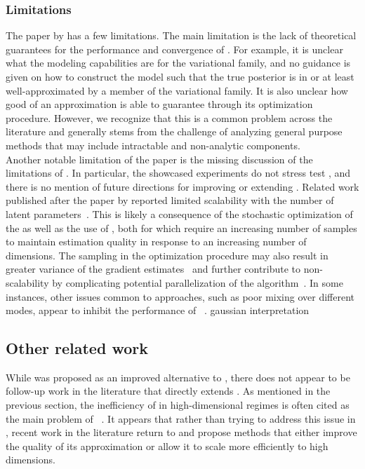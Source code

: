 \documentclass[10pt]{article}
\begin{document}
\subsubsection{Limitations}

The paper by \citet{Titsias:2019} has a few limitations. The main limitation is the lack of theoretical guarantees for the performance and convergence of \uivi. For example, it is unclear what the modeling capabilities are for the \uivi variational family, and no guidance is given on how to construct the model such that the true posterior is in or at least well-approximated by a member of the variational family. It is also unclear how good of an approximation \uivi is able to guarantee through its optimization procedure. However, we recognize that this is a common problem across the \vi literature and generally stems from the challenge of analyzing general purpose methods that may include intractable and non-analytic components.
\\

Another notable limitation of the paper is the missing discussion of the limitations of \uivi. In particular, the showcased experiments do not stress test \uivi, and there is no mention of future directions for improving or extending \uivi. Related work published after the paper by \citet{Titsias:2019} reported limited scalability with the number of latent parameters~\citep{Molchanova:2019,Moens:2021}. This is likely a consequence of the stochastic optimization of the \elbo as well as the use of \mcmc, both for which require an increasing number of samples to maintain estimation quality in response to an increasing number of dimensions. The \mcmc sampling in the \uivi optimization procedure may also result in greater variance of the \elbo gradient estimates~\citep{Betancourt:2015} and further contribute to non-scalability by complicating potential parallelization of the algorithm~\citep{Sobolev:2019}. In some instances, other issues common to \mcmc approaches, such as poor mixing over different modes, appear to inhibit the performance of \uivi~\citep{Sobolev:2019}. \todo gaussian interpretation


\subsection{Other related work} \label{an:postpaper}

While \uivi was proposed as an improved alternative to \sivi, there does not appear to be follow-up work in the literature that directly extends \uivi. As mentioned in the previous section, the inefficiency of \mcmc in high-dimensional regimes is often cited as the main problem of \uivi~\citep{Molchanova:2019,Moens:2021}. It appears that rather than trying to address this issue in \uivi, recent work in the literature return to \sivi and propose methods that either improve the quality of its approximation or allow it to scale more efficiently to high dimensions.
\\
\end{document}
